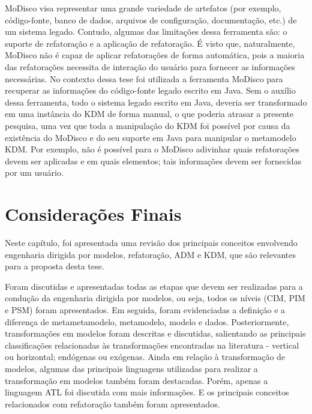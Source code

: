 MoDisco visa representar uma grande variedade de artefatos (por exemplo, código-fonte, banco de dados, arquivos de configuração, documentação, etc.) de um sistema legado. Contudo, algumas das limitações dessa ferramenta são: o suporte de refatoração e a aplicação de refatoração. É visto que, naturalmente, MoDisco não é capaz de aplicar refatorações de forma automática, pois a maioria das refatorações necessita de interação do usuário para fornecer as informações necessárias. No contexto dessa tese foi utilizada a ferramenta MoDisco para recuperar as informações do código-fonte legado escrito em Java. Sem o auxílio dessa ferramenta, todo o sistema legado escrito em Java, deveria ser transformado em uma instância do KDM de forma manual, o que poderia atrasar a presente pesquisa, uma vez que toda a manipulação do KDM foi possível por causa da existência do MoDisco e do seu suporte em Java para manipular o metamodelo KDM. Por exemplo, não é possível para o MoDisco adivinhar quais refatorações devem ser aplicadas e em quais elementos; tais informações devem ser fornecidas por um usuário.




\section{Considerações Finais}\label{capitulobaclCOnsideracoesFinais}

Neste capítulo, foi apresentada uma revisão dos principais conceitos envolvendo engenharia dirigida por modelos, refatoração, ADM e KDM, que são relevantes para a proposta desta tese. 

Foram discutidas e apresentadas todas as etapas que devem ser realizadas para a condução da engenharia dirigida por modelos, ou seja, todos os níveis (CIM, PIM e PSM) foram apresentados. Em seguida, foram evidenciadas a definição e a diferença de metametamodelo, metamodelo, modelo e dados. Posteriormente, transformações em modelos foram descritas e discutidas, salientando as principais classificações relacionadas às transformações encontradas na literatura - vertical ou horizontal; endógenas ou exógenas. Ainda em relação à transformação de modelos, algumas das principais linguagens utilizadas para realizar a transformação em modelos também foram destacadas. Porém, apenas a linguagem ATL foi discutida com mais informações. E os principais conceitos relacionados com refatoração também foram apresentados.


